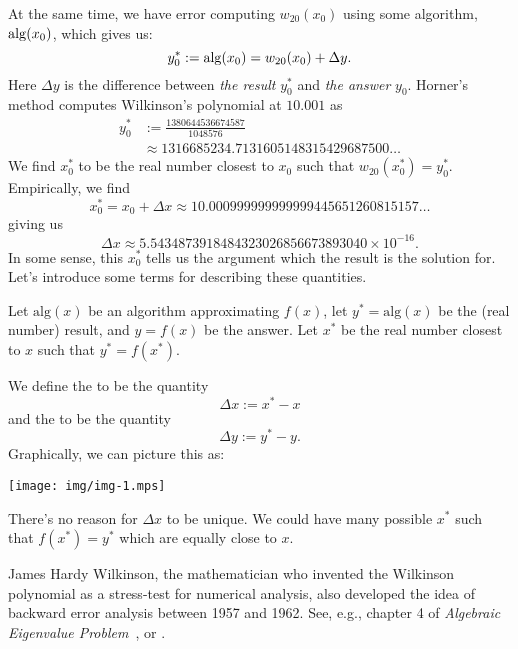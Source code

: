 At the same time, we have error computing $w_{20}(x_{0})$ using some
algorithm, ${\rm alg}(x_{0})$, which gives us:
\begin{equation}
  y_{0}^{*} := {\rm alg}(x_{0}) = w_{20}(x_{0}) + \Delta y.
\end{equation}
Here $\Delta y$ is the difference between \emph{the result} $y_{0}^{*}$
and \emph{the answer} $y_{0}$. Horner's method computes Wilkinson's
polynomial at $10.001$ as
\begin{equation}
  \begin{split}
  y_{0}^{*} &:= \frac{1380644536674587}{1048576}\\
  &\approx 1316685234.7131605148315429687500\dots
  \end{split}
\end{equation}
We find $x_{0}^{*}$ to be the real number closest to $x_{0}$ such that
$w_{20}(x_{0}^{*})=y_{0}^{*}$. Empirically, we find
\begin{equation}
  x_{0}^{*} = x_{0} + \Delta x \approx 10.000999999999999445651260815157\dots
\end{equation}
giving us
\begin{equation}
  \Delta x \approx 5.5434873918484323026856673893040\times 10^{-16}.
\end{equation}
In some sense, this $x_{0}^{*}$ tells us the argument which the result
is the solution for. Let's introduce some terms for describing these
quantities.
\begin{defn}
Let $\mathrm{alg}(x)$ be an algorithm approximating $f(x)$, let
$y^{*}=\mathrm{alg}(x)$ be the (real number) result, and $y=f(x)$ be the
answer. Let $x^{*}$ be the real number closest to $x$ such that
$y^{*}=f(x^{*})$.

We define the  to be the quantity
\begin{equation}
  \Delta x := x^{*} - x
\end{equation}
and the  to be the quantity
\begin{equation}
  \Delta y := y^{*} - y.
\end{equation}
Graphically, we can picture this as:
\begin{center}
  \texttt{[image: img/img-1.mps]}
\end{center}
\end{defn}
\begin{rmk}
  There's no reason for $\Delta x$ to be unique. We could have many
  possible $x^{*}$ such that $f(x^{*})=y^{*}$ which are equally close to
  $x$.
\end{rmk}
\begin{rmk}[History]
  James Hardy Wilkinson, the mathematician who invented the Wilkinson
  polynomial as a stress-test for numerical analysis, also developed the
  idea of backward error analysis between 1957 and 1962. See, e.g.,
  chapter 4 of
  \emph{Algebraic Eigenvalue Problem}~\cite{wilkinson1965}, or
  \cite[(\S6~\textit{et seq}.)]{wilkinson1963}.
\end{rmk}
